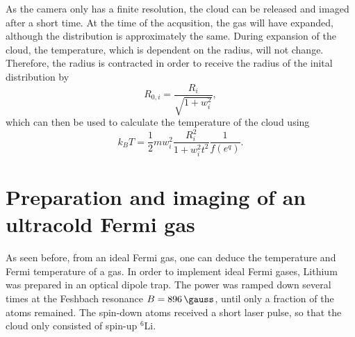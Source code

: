 As the camera only has a finite resolution, the cloud can be released and imaged after a short time. At the time of the acqusition, the gas will have expanded, although the distribution is approximately the same. During expansion of the cloud, the temperature, which is dependent on the radius, will not change. Therefore, the radius is contracted in order to receive the radius of the inital distribution by
\begin{equation}
R_{0,i} = \frac{R_{i}}{\sqrt{1+ w_i^2}},
\end{equation}
which can then be used to calculate the temperature of the cloud using
\begin{equation}
\label{eq:temp}
k_BT = \frac{1}{2} mw_i^2 \frac{R_i^2}{1+w_i^2t^2}\frac{1}{f(e^q)}.
\end{equation}


	
\section{Preparation and imaging of an ultracold Fermi gas}
\label{sec:fermiexperiment}

As seen before, from an ideal Fermi gas, one can deduce the temperature and Fermi temperature of a gas.
In order to implement ideal Fermi gases, Lithium was prepared in an optical dipole trap. The power was ramped down several times at the Feshbach resonance $B=\SI{896}{\gauss}$, until only a fraction of the atoms remained. The spin-down atoms received a short laser pulse, so that the cloud only consisted of spin-up $^6$Li.

